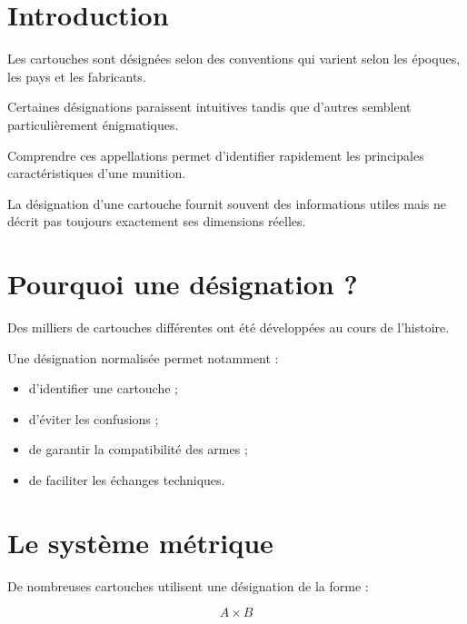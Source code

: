 
\section{Introduction}

Les cartouches sont désignées selon des conventions qui varient selon les
époques, les pays et les fabricants.

Certaines désignations paraissent intuitives tandis que d'autres semblent
particulièrement énigmatiques.

Comprendre ces appellations permet d'identifier rapidement les principales
caractéristiques d'une munition.

\begin{aretenir}

La désignation d'une cartouche fournit souvent des informations utiles mais
ne décrit pas toujours exactement ses dimensions réelles.

\end{aretenir}

\section{Pourquoi une désignation ?}

Des milliers de cartouches différentes ont été développées au cours de
l'histoire.

Une désignation normalisée permet notamment :

\begin{itemize}
    \item d'identifier une cartouche ;
    \item d'éviter les confusions ;
    \item de garantir la compatibilité des armes ;
    \item de faciliter les échanges techniques.
\end{itemize}

\section{Le système métrique}

De nombreuses cartouches utilisent une désignation de la forme :

\begin{equation}
A \times B
\end{equation}

